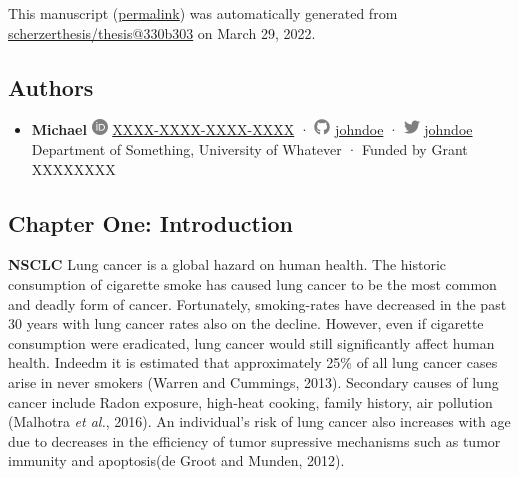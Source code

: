 This manuscript
(\href{https://scherzerthesis.github.io/thesis/v/330b3032e45afe681efd66fc81301108e295a421/}{permalink})
was automatically generated
from \href{https://github.com/scherzerthesis/thesis/tree/330b3032e45afe681efd66fc81301108e295a421}{scherzerthesis/thesis@330b303}
on March 29, 2022.

\hypertarget{authors}{%
\subsection{Authors}\label{authors}}

\begin{itemize}
\tightlist
\item
  \textbf{Michael}
  \includegraphics[width=0.16667in,height=0.16667in]{images/orcid.svg}
  \href{https://orcid.org/XXXX-XXXX-XXXX-XXXX}{XXXX-XXXX-XXXX-XXXX}
  · \includegraphics[width=0.16667in,height=0.16667in]{images/github.svg}
  \href{https://github.com/johndoe}{johndoe}
  · \includegraphics[width=0.16667in,height=0.16667in]{images/twitter.svg}
  \href{https://twitter.com/johndoe}{johndoe}
  Department of Something, University of Whatever
  · Funded by Grant XXXXXXXX
\end{itemize}

\hypertarget{chapter-one-introduction}{%
\subsection{Chapter One: Introduction}\label{chapter-one-introduction}}

\textbf{NSCLC} Lung cancer is a global hazard on human health. The historic consumption of cigarette smoke has caused lung cancer to be the most common and deadly form of cancer. Fortunately, smoking-rates have decreased in the past 30 years with lung cancer rates also on the decline. However, even if cigarette consumption were eradicated, lung cancer would still significantly affect human health. Indeedm it is estimated that approximately 25\% of all lung cancer cases arise in never smokers (Warren and Cummings, 2013). Secondary causes of lung cancer include Radon exposure, high-heat cooking, family history, air pollution (Malhotra \emph{et al.}, 2016). An individual's risk of lung cancer also increases with age due to decreases in the efficiency of tumor supressive mechanisms such as tumor immunity and apoptosis(de Groot and Munden, 2012).

